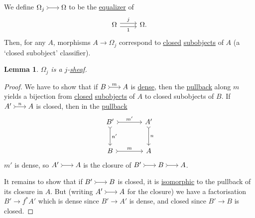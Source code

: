 \documentclass{article}
\newenvironment{tikzcdi}{\begin{tikzcd}[cramped, sep=scriptsize]}{\end{tikzcd}}
\let\to\longrightarrow
\newtheorem{nlemma}[nthm]{Lemma}
\begin{document}
We define $\begin{tikzcdi}\Omega_j \rar[tail] & \Omega\end{tikzcdi}$ to be the \hyperlink{def:equalizer}{equalizer} of
\begin{equation*}
  \begin{tikzcd}
    \Omega \rar[shift left]{j} \rar[shift right,']{1} & \Omega.
  \end{tikzcd}
\end{equation*}
Then, for any $A$, morphisms $A \to \Omega_j$ correspond to \hyperlink{def:denseclosed}{closed} \hyperlink{def:subobj}{subobjects} of $A$ (a `closed subobject' classifier).

\begin{nlemma}\label{lem:7.21}
  $\Omega_j$ is a $j$-\hyperlink{def:sheaf}{sheaf}.
\end{nlemma}
\begin{proof}
  We have to show that if $\begin{tikzcdi}B \rar[tail]{m} & A\end{tikzcdi}$ is \hyperlink{def:denseclosed}{dense}, then the \hyperlink{def:pullback}{pullback} along $m$ yields a bijection from \hyperlink{def:denseclosed}{closed} \hyperlink{def:subobj}{subobjects} of $A$ to closed subobjects of $B$.
  If $\begin{tikzcdi}A' \rar[tail]{n} & A\end{tikzcdi}$ is closed, then in the \hyperlink{def:pullback}{pullback}
  \begin{equation*}
    \begin{tikzcd}[sep=large]
      B' \rar[tail]{m'} \dar[tail]{n'} & A' \dar[tail]{n} \\
      B \rar[tail]{m} & A
    \end{tikzcd}
  \end{equation*}
  $m'$ is dense, so $\begin{tikzcdi}A' \rar[tail] & A\end{tikzcdi}$ is the closure of $\begin{tikzcdi}B' \rar[tail] & B \rar[tail] & A\end{tikzcdi}$.

  It remains to show that if $\begin{tikzcdi}B' \rar[tail] & B\end{tikzcdi}$ is closed, it is \hyperlink{def:iso}{isomorphic} to the pullback of its closure in $A$.
  But (writing $\begin{tikzcdi}A'\rar[tail] & A\end{tikzcdi}$ for the closure) we have a factorisation $B' \to f^* A'$ which is dense since $B' \to A'$ is dense, and closed since $B' \to B$ is closed.
\end{proof}
\end{document}
